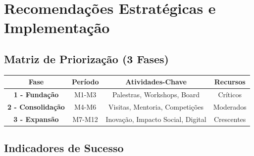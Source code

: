 \documentclass[12pt,a4paper,oneside]{article}
\begin{document}
\newpage


\section{Recomendações Estratégicas e Implementação}

\subsection{Matriz de Priorização (3 Fases)}

\begin{center}
\begin{tabular}{|c|c|c|c|}
\hline
\textbf{\color{spe-primary}Fase} & \textbf{\color{spe-primary}Período} & \textbf{\color{spe-primary}Atividades-Chave} & \textbf{\color{spe-primary}Recursos} \\
\hline
\color{spe-accent}\textbf{1 - Fundação} & \textcolor{spe-accent}{M1-M3} & Palestras, Workshops, Board & Críticos \\
\hline
\color{spe-accent}\textbf{2 - Consolidação} & \textcolor{spe-accent}{M4-M6} & Visitas, Mentoria, Competições & Moderados \\
\hline
\color{spe-accent}\textbf{3 - Expansão} & \textcolor{spe-accent}{M7-M12} & Inovação, Impacto Social, Digital & Crescentes \\
\hline
\end{tabular}
\end{center}

\vspace{1.5cm}

\subsection{Indicadores de Sucesso}
\end{document}
